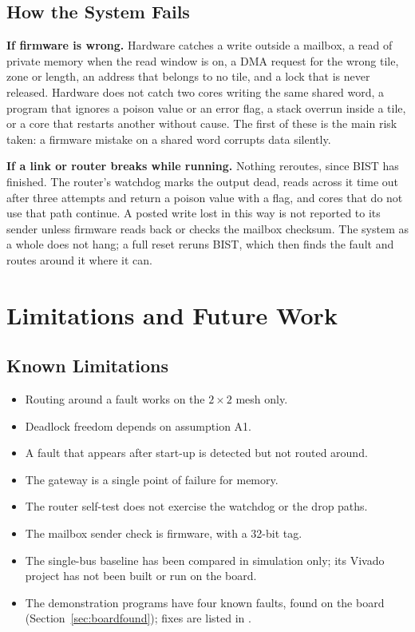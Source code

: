 \documentclass[11pt,a4paper]{article}
\newcommand{\code}[1]{\texttt{\detokenize{#1}}}
\begin{document}
\subsection{How the System Fails}

\textbf{If firmware is wrong.} Hardware catches a write outside a mailbox, a
read of private memory when the read window is on, a DMA request for the
wrong tile, zone or length, an address that belongs to no tile, and a lock
that is never released. Hardware does not catch two cores writing the same
shared word, a program that ignores a poison value or an error flag, a stack
overrun inside a tile, or a core that restarts another without cause. The
first of these is the main risk taken: a firmware mistake on a shared word
corrupts data silently.

\textbf{If a link or router breaks while running.} Nothing reroutes, since
BIST has finished. The router's watchdog marks the output dead, reads across
it time out after three attempts and return a poison value with a flag, and
cores that do not use that path continue. A posted write lost in this way is
not reported to its sender unless firmware reads back or checks the mailbox
checksum. The system as a whole does not hang; a full reset reruns BIST,
which then finds the fault and routes around it where it can.

\section{Limitations and Future Work}

\subsection{Known Limitations}

\begin{itemize}
\item Routing around a fault works on the $2\times2$ mesh only.
\item Deadlock freedom depends on assumption A1.
\item A fault that appears after start-up is detected but not routed around.
\item The gateway is a single point of failure for memory.
\item The router self-test does not exercise the watchdog or the drop paths.
\item The mailbox sender check is firmware, with a 32-bit tag.
\item The single-bus baseline has been compared in simulation only; its Vivado
project has not been built or run on the board.
\item The demonstration programs have four known faults, found on the board
(Section~\ref{sec:boardfound}); fixes are listed in \code{todo/sw_changes.md}.
\end{itemize}
\end{document}

